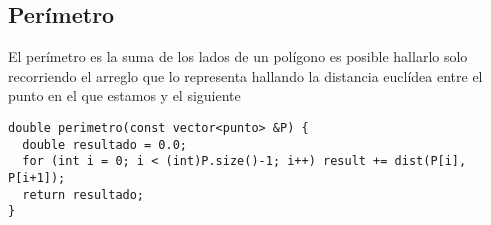 \subsection{Perímetro}
El perímetro es la suma de los lados de un polígono es posible hallarlo solo recorriendo el arreglo que lo representa hallando
la distancia euclídea entre el punto en el que estamos y el siguiente
\begin{lstlisting}[style=C]
double perimetro(const vector<punto> &P) {
  double resultado = 0.0;
  for (int i = 0; i < (int)P.size()-1; i++) result += dist(P[i], P[i+1]);
  return resultado;
}
\end{lstlisting}

